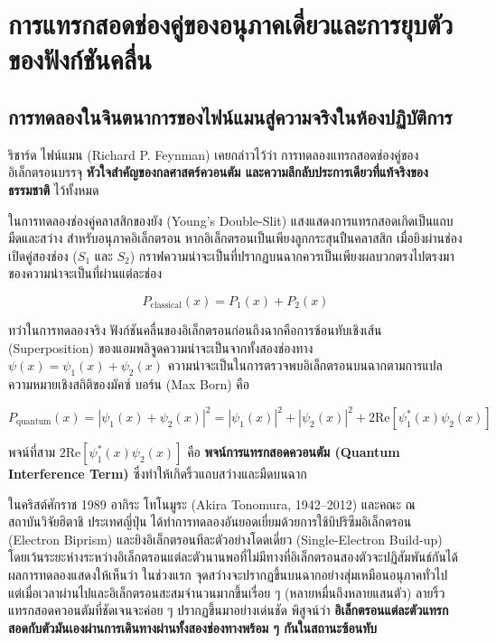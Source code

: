 \section{การแทรกสอดช่องคู่ของอนุภาคเดี่ยวและการยุบตัวของฟังก์ชันคลื่น}

\subsection{การทดลองในจินตนาการของไฟน์แมนสู่ความจริงในห้องปฏิบัติการ}

ริชาร์ด ไฟน์แมน (Richard P. Feynman) เคยกล่าวไว้ว่า การทดลองแทรกสอดช่องคู่ของอิเล็กตรอนบรรจุ \textbf{หัวใจสำคัญของกลศาสตร์ควอนตัม และความลึกลับประการเดียวที่แท้จริงของธรรมชาติ} ไว้ทั้งหมด

ในการทดลองช่องคู่คลาสสิกของยัง (Young's Double-Slit) แสงแสดงการแทรกสอดเกิดเป็นแถบมืดและสว่าง สำหรับอนุภาคอิเล็กตรอน หากอิเล็กตรอนเป็นเพียงลูกกระสุนปืนคลาสสิก เมื่อยิงผ่านช่องเปิดคู่สองช่อง ($S_1$ และ $S_2$) กราฟความน่าจะเป็นที่ปรากฏบนฉากควรเป็นเพียงผลบวกตรงไปตรงมาของความน่าจะเป็นที่ผ่านแต่ละช่อง

\begin{equation}
P_{\text{classical}}(x) = P_1(x) + P_2(x)
\end{equation}

ทว่าในการทดลองจริง ฟังก์ชันคลื่นของอิเล็กตรอนก่อนถึงฉากคือการซ้อนทับเชิงเส้น (Superposition) ของแอมพลิจูดความน่าจะเป็นจากทั้งสองช่องทาง $\psi(x) = \psi_1(x) + \psi_2(x)$ ความน่าจะเป็นในการตรวจพบอิเล็กตรอนบนฉากตามการแปลความหมายเชิงสถิติของมัคซ์ บอร์น (Max Born) คือ

\begin{equation}
P_{\text{quantum}}(x) = |\psi_1(x) + \psi_2(x)|^2 = |\psi_1(x)|^2 + |\psi_2(x)|^2 + 2\text{Re}[\psi_1^*(x)\psi_2(x)]
\label{eq:quantum_interference_pattern}
\end{equation}

พจน์ที่สาม $2\text{Re}[\psi_1^*(x)\psi_2(x)]$ คือ \textbf{พจน์การแทรกสอดควอนตัม (Quantum Interference Term)} ซึ่งทำให้เกิดริ้วแถบสว่างและมืดบนฉาก

ในคริสต์ศักราช 1989 อากิระ โทโนมูระ (Akira Tonomura, 1942--2012) และคณะ ณ สถาบันวิจัยฮิตาชิ ประเทศญี่ปุ่น ได้ทำการทดลองอันยอดเยี่ยมด้วยการใช้บิปริซึมอิเล็กตรอน (Electron Biprism) และยิงอิเล็กตรอนทีละตัวอย่างโดดเดี่ยว (Single-Electron Build-up) โดยเว้นระยะห่างระหว่างอิเล็กตรอนแต่ละตัวนานพอที่ไม่มีทางที่อิเล็กตรอนสองตัวจะปฏิสัมพันธ์กันได้ ผลการทดลองแสดงให้เห็นว่า ในช่วงแรก จุดสว่างจะปรากฏขึ้นบนฉากอย่างสุ่มเหมือนอนุภาคทั่วไป แต่เมื่อเวลาผ่านไปและอิเล็กตรอนสะสมจำนวนมากขึ้นเรื่อย ๆ (หลายหมื่นถึงหลายแสนตัว) ลายริ้วแทรกสอดควอนตัมที่ชัดเจนจะค่อย ๆ ปรากฏขึ้นมาอย่างเด่นชัด พิสูจน์ว่า \textbf{อิเล็กตรอนแต่ละตัวแทรกสอดกับตัวมันเองผ่านการเดินทางผ่านทั้งสองช่องทางพร้อม ๆ กันในสถานะซ้อนทับ}


